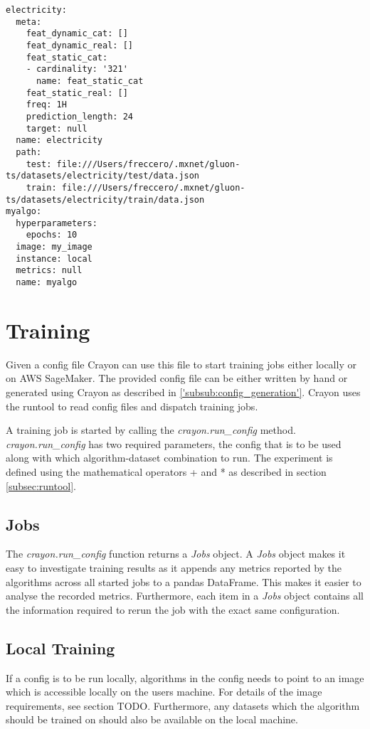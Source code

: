 \begin{lstlisting}[label={output:config_generation_gluonts}, caption=Output of \ref{code:config_generation_gluonts}]
electricity:
  meta:
    feat_dynamic_cat: []
    feat_dynamic_real: []
    feat_static_cat:
    - cardinality: '321'
      name: feat_static_cat
    feat_static_real: []
    freq: 1H
    prediction_length: 24
    target: null
  name: electricity
  path:
    test: file:///Users/freccero/.mxnet/gluon-ts/datasets/electricity/test/data.json
    train: file:///Users/freccero/.mxnet/gluon-ts/datasets/electricity/train/data.json
myalgo:
  hyperparameters:
    epochs: 10
  image: my_image
  instance: local
  metrics: null
  name: myalgo
\end{lstlisting}

\section{Training}
Given a config file Crayon can use this file to start training jobs either locally or on AWS SageMaker. The provided config file can be either written by hand or generated using Crayon as described in \ref{'subsub:config_generation'}. Crayon uses the runtool to read config files and dispatch training jobs. 

A training job is started by calling the \textit{crayon.run\_config} method.  \textit{crayon.run\_config} has two required parameters, the config that is to be used along with which algorithm-dataset combination to run. The experiment is defined using the mathematical operators + and * as described in section \ref{subsec:runtool}. 

\subsection{Jobs}
\label{subsubsec:jobs}
The \textit{crayon.run\_config} function returns a \textit{Jobs} object. A \textit{Jobs} object makes it easy to investigate training results as it appends any metrics reported by the algorithms across all started jobs to a pandas DataFrame. This makes it easier to analyse the recorded metrics. Furthermore, each item in a \textit{Jobs} object contains all the information required to rerun the job with the exact same configuration. 

\subsection{Local Training}
If a config is to be run locally, algorithms in the config needs to point to an image which is accessible locally on the users machine. For details of the image requirements, see section TODO. Furthermore, any datasets which the algorithm should be trained on should also be available on the local machine. 

